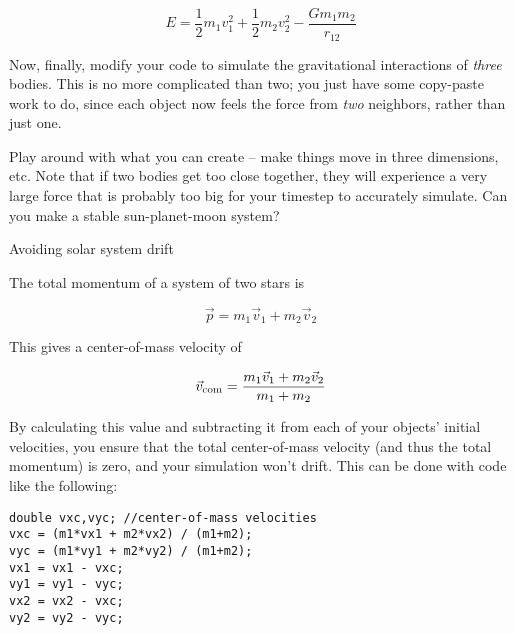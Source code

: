 \documentclass[12pt]{article}
\begin{document}
\begin{enumerate}
{   \begin{equation}
     E = \frac{1}{2}m_1v_1^2 + \frac{1}{2}m_2v_2^2 - \frac{Gm_1m_2}{r_{12}}
   \end{equation}

\item Now, finally, modify your code to simulate the gravitational interactions of {\it 
three} bodies. This is no more complicated than two; you just have some copy-paste work
to do, since each object now feels the force from {\it two} neighbors, rather than just one.

Play around with what you can create -- make things move in three dimensions, etc. Note that if two bodies get too close together,
they will experience a very large force that is probably too big for your timestep to accurately simulate. Can you make a stable
sun-planet-moon system?

}
  \end{enumerate}

\bigskip
\bigskip

\begin{center}
\Large Avoiding solar system drift
\end{center}

\normalsize

The total momentum of a system of two stars is

$$
\vec p =m_1 \vec v_1 + m_2 \vec v_2
$$

This gives a center-of-mass velocity of 

$$\vec v_{\rm com} = \frac{m_1 \vec v_1 + m_2 \vec v_2}{m_1+m_2}$$

By calculating this value and subtracting it from each of your objects' initial velocities,
you ensure that the total center-of-mass velocity (and thus the total momentum) is zero,
and your simulation won't drift. This can be done with code like the following:

\begin{verbatim}
double vxc,vyc; //center-of-mass velocities
vxc = (m1*vx1 + m2*vx2) / (m1+m2); 
vyc = (m1*vy1 + m2*vy2) / (m1+m2); 
vx1 = vx1 - vxc;
vy1 = vy1 - vyc;
vx2 = vx2 - vxc;
vy2 = vy2 - vyc;
\end{verbatim}
\end{document}

